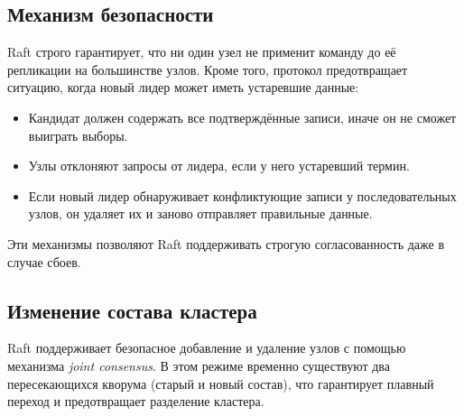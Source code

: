 \subsection{Механизм безопасности}

Raft строго гарантирует, что ни один узел не применит команду до её репликации на
большинстве узлов. Кроме того, протокол предотвращает ситуацию, когда новый лидер может
иметь устаревшие данные:

\begin{itemize}
    \item Кандидат должен содержать все подтверждённые записи, иначе он не сможет
    выиграть выборы.
    \item Узлы отклоняют запросы от лидера, если у него устаревший термин.
    \item Если новый лидер обнаруживает конфликтующие записи у последовательных узлов,
    он удаляет их и заново отправляет правильные данные.
\end{itemize}

Эти механизмы позволяют Raft поддерживать строгую согласованность даже в случае сбоев.

\subsection{Изменение состава кластера}

Raft поддерживает безопасное добавление и удаление узлов с помощью механизма
\textit{joint consensus}. В этом режиме временно существуют два пересекающихся кворума
(старый и новый состав), что гарантирует плавный переход и предотвращает разделение
кластера.
